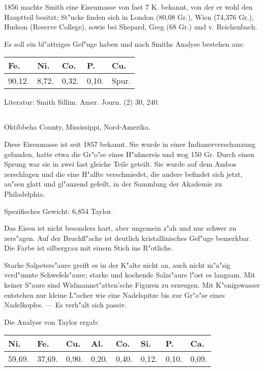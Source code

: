 \documentclass[a4paper, 11pt, oneside]{article}
\begin{document}
1856 machte Smith eine Eisenmasse von fast 7 K. bekannt, von der er wohl den Hauptteil besitzt; St"ucke finden sich in London (80,08 Gr.), Wien (74,376 Gr.), Hudson (Reserve College), sowie bei Shepard, Greg (68 Gr.) und v. Reichenbach.

Es soll ein bl"attriges Gef"uge haben und nach Smiths Analyse bestehen aus:
\begin{table}[H]
    \centering\swabfamily\Large
    \begin{tabular}{l l l l l}
        Fe. & Ni. & Co. & P. & Cu. \\ \hline
        90,12. & 8,72. & 0,32. & 0,10. & Spur. \\
    \end{tabular}
\end{table}

\normalsize
Literatur: Smith Sillim. Amer. Journ. (2) 30, 240.

\subsection{}
\LARGE
\paragraph{}
Oktibbeha County, Mississippi, Nord-Amerika.

Diese Eisenmasse ist seit 1857 bekannt. Sie wurde in einer Indianerverschanzung gefunden, hatte etwa die Gr"o"se eines H"uhnereis und wog 150 Gr. Durch einen Sprung war sie in zwei fast gleiche Teile geteilt. Sie wurde auf dem Ambos zerschlagen und die eine H"alfte verschmiedet, die andere befindet sich jetzt, au"sen glatt und gl"anzend gefeilt, in der Sammlung der Akademie zu Philadelphia.

Spezifisches Gewicht: 6,854 Taylor.

Das Eisen ist nicht besonders hart, aber ungemein z"ah und nur schwer zu zers"agen. Auf der Bruchfl"ache ist deutlich kristallinisches Gef"uge bemerkbar. Die Farbe ist silbergrau mit einem Stich ins R"otliche.

Starke Salpeters"aure greift es in der K"alte nicht an, auch nicht m"a"sig verd"unnte Schwefels"aure; starke und kochende Salzs"aure l"ost es langsam. Mit keiner S"aure sind Widmannst"atten'sche Figuren zu erzeugen. Mit K"onigswasser entstehen nur kleine L"ocher wie eine Nadelspitze bis zur Gr"o"se eines Nadelkopfes. --- Es verh"alt sich passiv.

Die Analyse von Taylor ergab:
\begin{table}[H]
    \centering\swabfamily\Large
    \begin{tabular}{l l l l l l l l}
        Ni. & Fe. & Cu. & Al. & Co. & Si. & P. & Ca. \\ \hline
        59,69. & 37,69. & 0,90. & 0,20. & 0,40. & 0,12. & 0,10. & 0,09. \\
    \end{tabular}
\end{table}
\end{document}
